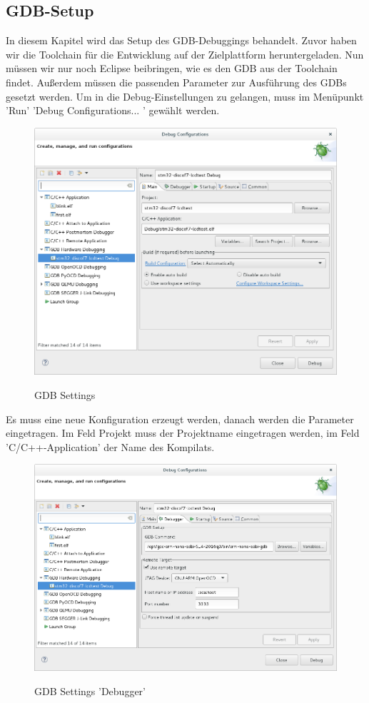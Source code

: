 \documentclass[12pt,a4paper]{article}
\begin{document}
\subsection{GDB-Setup}
In diesem Kapitel wird das Setup des GDB-Debuggings behandelt. Zuvor haben wir die Toolchain für die Entwicklung auf der Zielplattform heruntergeladen. Nun müssen wir nur noch Eclipse beibringen, wie es den GDB aus der Toolchain findet. Außerdem müssen die passenden Parameter zur Ausführung des GDBs gesetzt werden.
Um in die Debug-Einstellungen zu gelangen, muss im Menüpunkt 'Run' 'Debug Configurations... ' gewählt werden. 
\begin{figure}[h]
\begin{center}
\includegraphics[width=12cm]{grafiken/debugger/GDBsetting1.png}
\label{ecplipse_GDB_setting1}
\caption{GDB Settings}
\end{center}
\end{figure}
Es muss eine neue Konfiguration erzeugt werden, danach werden die Parameter eingetragen. Im Feld Projekt muss der Projektname eingetragen werden, im Feld 'C/C++-Application' der Name des Kompilats.
\begin{figure}[h]
\begin{center}
\includegraphics[width=12cm]{grafiken/debugger/GDBsetting2.png}
\label{ecplipse_GDB_setting2}
\caption{GDB Settings 'Debugger'}
\end{center}
\end{figure}
\end{document}
